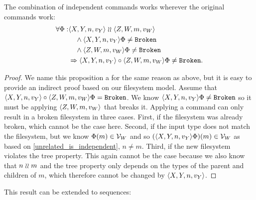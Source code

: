 \begin{myax}\label{combine_independent_commands}
The combination of independent commands works wherever the original commands work:
\begin{align*}
\forall\Phi: &\langle{X,Y,n,v_Y}\rangle\mathrel{\wr\wr} \langle{Z,W,m,v_W}\rangle \\
&\quad\wedge \langle{X,Y,n,v_Y}\rangle\Phi\neq\mathtt{Broken} \\
&\quad\wedge \langle{Z,W,m,v_W}\rangle\Phi\neq\mathtt{Broken} \\
&\Rightarrow \langle{X,Y,n,v_Y}\rangle\circ \langle{Z,W,m,v_W}\rangle\Phi\neq\mathtt{Broken}.
\end{align*}
\end{myax}
\begin{proof}
We name this proposition a  for the same reason as above,
but it is easy to provide an indirect proof based on our filesystem model.
Assume that $\langle{X,Y,n,v_Y}\rangle\circ \langle{Z,W,m,v_W}\rangle\Phi=\mathtt{Broken}$.
We know $\langle{X,Y,n,v_Y}\rangle\Phi\neq\mathtt{Broken}$ so it must be applying 
$\langle{Z,W,m,v_W}\rangle$ that breaks it.
Applying a command can only result in a broken filesystem in three cases.
First, if the filesystem was already broken, which cannot be the case here.
Second, if the input type does not match the filesystem,
but we know $\Phi(m)\in\mathcal{V}_{W}$ and so
$(\langle{X,Y,n,v_Y}\rangle\Phi)(m)\in\mathcal{V}_{W}$ as based on \cref{unrelated_is_independent}, $n\neq m$.
Third, if the new filesystem violates the tree property.
This again cannot be the case because we also know that $n\mathrel{\wr\wr} m$
and the tree property only depends on the types of the parent and children of $m$,
which therefore cannot be changed by $\langle{X,Y,n,v_Y}\rangle$.
\end{proof}

This result can be extended to sequences:

